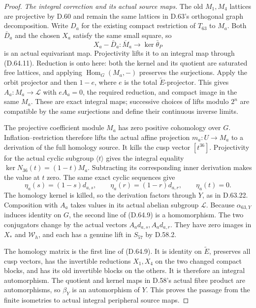 \begin{proof}
\emph{The integral correction and its actual source maps.}
The old \(M_1,M_4\) lattices are projective by
D.60 and remain the same lattices in D.63's
orthogonal graph decomposition. Write \(D_a\)
for the existing compact restriction of \(T_{63}\)
to \(M_a\). Both \(\bar D_a\) and the chosen
\(X_a\) satisfy the same small square, so
\[
          X_a-\bar D_a:\overline M_a
                         \longrightarrow\ker\bar\theta_P
 \tag{D.64.19}
\]
is an actual equivariant map. Projectivity lifts
it to an integral map through (D.64.11). Reduction
is onto here: both the kernel and its quotient
are saturated free lattices, and applying
\(\operatorname{Hom}_G(M_a,-)\) preserves the
surjections. Apply the orbit projector and then
\(1-e\), where \(e\) is the total
\(\widetilde E\)-projector. This gives
\(A_a:M_a\to\mathcal L\) with \(eA_a=0\),
the required reduction, and compact image in
the same \(M_a\). These are exact integral maps;
successive choices of lifts modulo \(2^n\) are
compatible by the same surjections and define
their continuous inverse limits.

The projective coefficient module \(M_a\) has
zero positive cohomology over \(G\).
Inflation--restriction therefore lifts the
actual affine projection \(m_a:U\to M_a\)
to a derivation of the full homology source.
It kills the cusp vector \([t^{36}]\).
Projectivity for the actual cyclic subgroup
\(\langle t\rangle\) gives the integral equality
\(\ker N_{36}(t)=(1-t)M_a\).
Subtracting its corresponding inner derivation
makes the value at \(t\) zero. The same exact
cyclic sequences give
\[
 \eta_a(s)=(1-s)d_{a,s},\qquad
 \eta_a(r)=(1-r)d_{a,r},\qquad
 \eta_a(t)=0.
 \tag{D.64.20}
\]
The homology kernel is killed, so the derivation
factors through \(Y\), as in D.63.22.
Composition with \(A_a\) takes values in its
actual abelian subgroup \(\mathcal L\).
Because \(\alpha_{63,Y}\) induces identity on
\(G\), the second line of (D.64.9) is a
homomorphism. The two conjugators change by
the actual vectors \(A_ad_{a,s},A_ad_{a,r}\).
They have zero images in \(X_*\) and
\(\mathcal W_h\), and each has a genuine lift
in \(S_{57}\) by D.58.2.

The homology matrix is the first line of
(D.64.9). It is identity on \(\widetilde E\),
preserves all cusp vectors, has the invertible
reductions \(X_1,X_4\) on the two changed compact
blocks, and has its old invertible blocks on
the others. It is therefore an integral
automorphism. The quotient and kernel maps
in D.58's actual fibre product are automorphisms,
so \(\beta_Y\) is an automorphism of \(Y\).
This proves the passage from the finite isometries
to actual integral peripheral source maps.


\end{proof}
